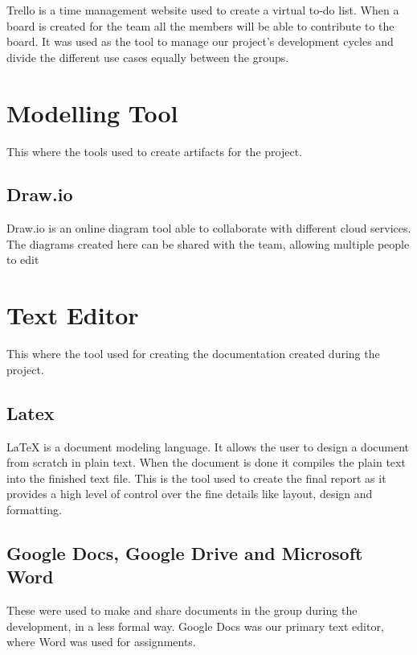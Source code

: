 Trello is a time management website used to create a virtual to-do list. When
 a board is created for the team all the members will be able to contribute to
  the board. It was used as the tool to manage our project’s development cycles
   and divide the different use cases equally between the groups.

\section{Modelling Tool}

This where the tools used to create artifacts for the project.

\subsection{Draw.io}

Draw.io is an online diagram tool able to collaborate with different cloud
 services. The diagrams created here can be shared with the team, allowing
  multiple people to edit

\section{Text Editor}

This where the tool used for creating the documentation created during
 the project.

\subsection{Latex}

 LaTeX is a document modeling language. It allows the user to design
  a document from scratch in plain text. When the document is done it compiles
   the plain text into the finished text file. This is the tool used to create
    the final report as it provides a high level of control over the fine
     details like layout, design and formatting.

\subsection{Google Docs, Google Drive and Microsoft Word}

These were used to make and share documents in the group during the
 development, in a less formal way. Google Docs was our primary text
  editor, where Word was used for assignments.
